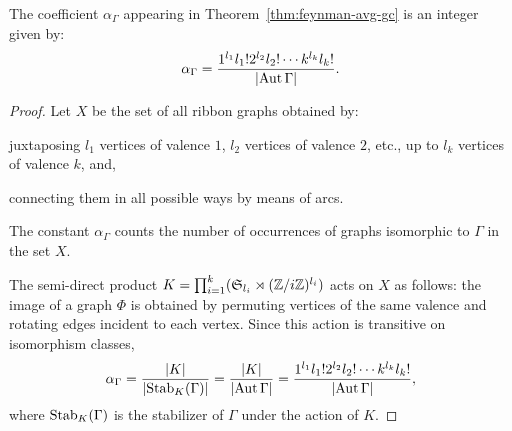 \begin{lemma}\label{thm:feynman-avg-coeff}
  The coefficient $\alpha_\Gamma$ appearing in
  Theorem~\ref{thm:feynman-avg-gc} is an integer given by:
  \begin{equation*}
    \alpha_\Gamma =
    \frac{1^{l_1} l_1! 2^{l_2} l_2! \cdots k^{l_k} l_k!}
    {\lvert\operatorname{Aut}\Gamma\rvert}.
  \end{equation*}
\end{lemma}
\begin{proof}
  Let $X$ be the set of all ribbon graphs obtained by:
  \begin{inparaenum}
  \item juxtaposing $l_1$ vertices of valence $1$, $l_2$
    vertices of valence $2$, etc., up to $l_k$ vertices of valence
    $k$, and,
  \item connecting them in all possible ways by means of arcs.
  \end{inparaenum}
  The constant $\alpha_\Gamma$ counts the number of occurrences of graphs
  isomorphic to $\Gamma$ in the set $X$.
  
  The semi-direct product $K = \prod_{i=1}^k(\mathfrak{S}_{l_i} \rtimes
(\mathbb{Z}/i\mathbb{Z})^{l_i})$
  acts on $X$ as follows: the image of a graph
  $\Phi$ is obtained by permuting vertices of the same valence and
  rotating edges incident to each vertex. Since this action is
  transitive on isomorphism classes,
  \begin{equation*}
    \alpha_\Gamma = \frac {\lvert K\rvert} {\lvert\textrm{Stab}_K(\Gamma)\rvert}
    = \frac {\lvert K\rvert} {\lvert\operatorname{Aut}\Gamma\rvert}
    = \frac{1^{l_1} l_1! 2^{l_2} l_2! \cdots
      k^{l_k} l_k!}{\lvert\operatorname{Aut}\Gamma\rvert},
  \end{equation*}
  where $\textrm{Stab}_K(\Gamma)$ is the stabilizer of $\Gamma$ under the
  action of $K$.
\end{proof}

